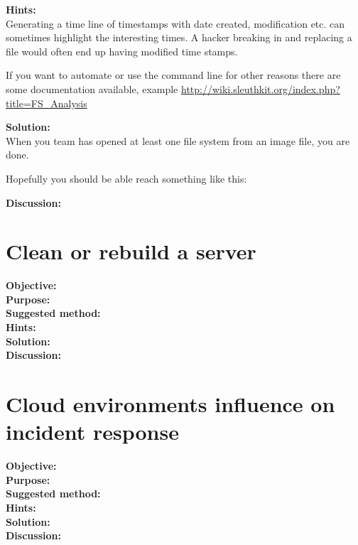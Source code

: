 \documentclass[a4paper,11pt,notitlepage]{report}
\begin{document}
{\bf Hints:}\\
Generating a time line of timestamps with date created, modification etc. can sometimes highlight the interesting times. A hacker breaking in and replacing a file would often end up having modified time stamps.

If you want to automate or use the command line for other reasons there are some documentation available, example \url{http://wiki.sleuthkit.org/index.php?title=FS_Analysis}

{\bf Solution:}\\
When you team has opened at least one file system from an image file, you are done.

Hopefully you should be able reach something like this:

{\bf Discussion:}\\



\chapter{Clean or rebuild a server}
\label{ex:clean-or-rebuild}

{\bf Objective:}\\


{\bf Purpose:}\\


{\bf Suggested method:}\\


{\bf Hints:}\\


{\bf Solution:}\\


{\bf Discussion:}\\


\chapter{Cloud environments influence on incident response}
\label{ex:cloud-incident-response}

{\bf Objective:}\\


{\bf Purpose:}\\


{\bf Suggested method:}\\


{\bf Hints:}\\


{\bf Solution:}\\


{\bf Discussion:}\\
\end{document}
